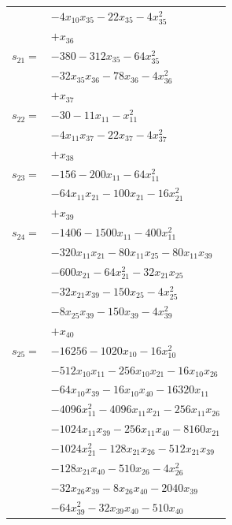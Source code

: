 \begin{longtable}{@{}r@{\;}l@{}}
 & \(\displaystyle -4x_{10}x_{35} -22x_{35} -4x_{35}^{2}\) \\
 & \(\displaystyle +x_{36}\) \\[3pt]
\(s_{21}=\) & \(\displaystyle -380 -312x_{35} -64x_{35}^{2}\) \\
 & \(\displaystyle -32x_{35}x_{36} -78x_{36} -4x_{36}^{2}\) \\
 & \(\displaystyle +x_{37}\) \\[3pt]
\(s_{22}=\) & \(\displaystyle -30 -11x_{11} -x_{11}^{2}\) \\
 & \(\displaystyle -4x_{11}x_{37} -22x_{37} -4x_{37}^{2}\) \\
 & \(\displaystyle +x_{38}\) \\[3pt]
\(s_{23}=\) & \(\displaystyle -156 -200x_{11} -64x_{11}^{2}\) \\
 & \(\displaystyle -64x_{11}x_{21} -100x_{21} -16x_{21}^{2}\) \\
 & \(\displaystyle +x_{39}\) \\[3pt]
\(s_{24}=\) & \(\displaystyle -1406 -1500x_{11} -400x_{11}^{2}\) \\
 & \(\displaystyle -320x_{11}x_{21} -80x_{11}x_{25} -80x_{11}x_{39}\) \\
 & \(\displaystyle -600x_{21} -64x_{21}^{2} -32x_{21}x_{25}\) \\
 & \(\displaystyle -32x_{21}x_{39} -150x_{25} -4x_{25}^{2}\) \\
 & \(\displaystyle -8x_{25}x_{39} -150x_{39} -4x_{39}^{2}\) \\
 & \(\displaystyle +x_{40}\) \\[3pt]
\(s_{25}=\) & \(\displaystyle -16256 -1020x_{10} -16x_{10}^{2}\) \\
 & \(\displaystyle -512x_{10}x_{11} -256x_{10}x_{21} -16x_{10}x_{26}\) \\
 & \(\displaystyle -64x_{10}x_{39} -16x_{10}x_{40} -16320x_{11}\) \\
 & \(\displaystyle -4096x_{11}^{2} -4096x_{11}x_{21} -256x_{11}x_{26}\) \\
 & \(\displaystyle -1024x_{11}x_{39} -256x_{11}x_{40} -8160x_{21}\) \\
 & \(\displaystyle -1024x_{21}^{2} -128x_{21}x_{26} -512x_{21}x_{39}\) \\
 & \(\displaystyle -128x_{21}x_{40} -510x_{26} -4x_{26}^{2}\) \\
 & \(\displaystyle -32x_{26}x_{39} -8x_{26}x_{40} -2040x_{39}\) \\
 & \(\displaystyle -64x_{39}^{2} -32x_{39}x_{40} -510x_{40}\) \\

\end{longtable}
